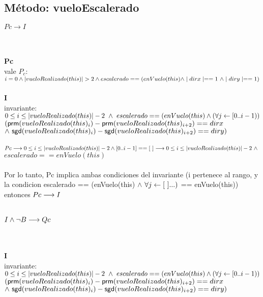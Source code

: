 \documentclass[a4paper]{article}
\begin{document}
    \subsection{M\'etodo: vueloEscalerado}
        \noindent
        \begin{Large}
        {$Pc \rightarrow I$}
        \end{Large}\\
        \\
        \textbf{Pc}\\
        vale $ P_c $: $ i = 0 \land \longitud{vueloRealizado(this)} > 2 \land escalerado == (enVuelo(this) \land \mid dirx \mid == 1 \ \land \mid diry \mid == 1) $ \\
        \\
		\textbf{I}\\
        invariante:$ 0 \leq i \leq \left| vueloRealizado(this) \right| -2 \ \land \ escalerado == (enVuelo(this) \land (\forall j \leftarrow [0..i -1)) $ $ (\mathsf{prm}(vueloRealizado(this)_i) - \mathsf{prm}(vueloRealizado(this)_{i+2}) == dirx $ $ \land \ \mathsf{sgd}(vueloRealizado(this)_i) - \mathsf{sgd}(vueloRealizado(this)_{i+2}) == diry) $ \\   
\\ $Pc \longrightarrow 0 \leq i \leq \left| vueloRealizado(this) \right| -2 \land [0..i-1] == [\ ] \longrightarrow 0 \leq i \leq \left| vueloRealizado(this) \right| -2 \ \land \ $\\$ escalerado == enVuelo(this)$ \\
\\ Por lo tanto, Pc implica ambas condiciones del invariante (i pertenece al rango, y la condicion escalerado == (enVuelo(this) $\land$ $\forall j \leftarrow [\ ]...) $ == enVuelo(this)) \\ entonces $Pc \longrightarrow I$ \\
\\
\begin{Large}
        {$I \land \neg B \longrightarrow Qc$}
        \end{Large}\\
        \\
        \textbf{I}\\
        invariante: $ 0 \leq i \leq \left| vueloRealizado(this) \right| -2 \ \land \ escalerado == (enVuelo(this) \land (\forall j \leftarrow [0..i -1)) $ $ (\mathsf{prm}(vueloRealizado(this)_i) - \mathsf{prm}(vueloRealizado(this)_{i+2}) == dirx $ $ \land \ \mathsf{sgd}(vueloRealizado(this)_i) - \mathsf{sgd}(vueloRealizado(this)_{i+2}) == diry) $ \\
        \\
\end{document}
